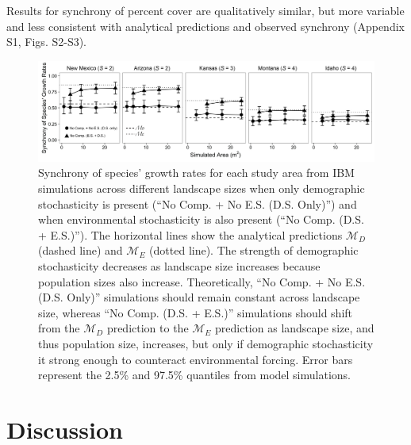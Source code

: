 \documentclass[12pt,]{article}
\begin{document}
Results for synchrony of percent cover are qualitatively similar, but
more variable and less consistent with analytical predictions and
observed synchrony (Appendix S1, Figs. S2-S3).

\begin{figure}[!ht]
  \centering
      \includegraphics[width=6in]{./components/formatted_figures/formatted_figure2.png}
  \caption{Synchrony of species' growth rates for each study area from IBM simulations across different landscape sizes when only demographic stochasticity is present (``No Comp. + No E.S. (D.S. Only)'') and when environmental stochasticity is also present (``No Comp. (D.S. + E.S.)''). The horizontal lines show the analytical predictions $\mathcal{M}_D$ (dashed line) and $\mathcal{M}_E$ (dotted line). The strength of demographic stochasticity decreases as landscape size increases because population sizes also increase. Theoretically, ``No Comp. + No E.S. (D.S. Only)'' simulations should remain constant across landscape size, whereas ``No Comp. (D.S. + E.S.)'' simulations should shift from the $\mathcal{M}_D$ prediction to the $\mathcal{M}_E$ prediction as landscape size, and thus population size, increases, but only if demographic stochasticity it strong enough to counteract environmental forcing. Error bars represent the 2.5\% and 97.5\% quantiles from model simulations.}
\end{figure}

\section{Discussion}
\end{document}
